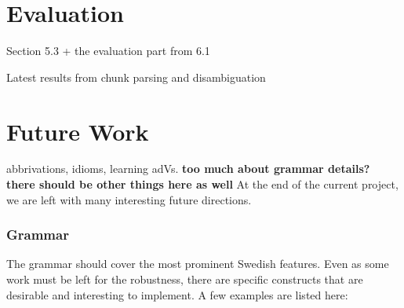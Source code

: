 \documentclass[runningheads,a4paper]{llncs}
\begin{document}
\section{Evaluation}

Section 5.3 + the evaluation part from 6.1 

Latest results from chunk parsing and disambiguation

\section{Future Work}

abbrivations, idioms, learning adVs.
\textbf{too much about grammar details? there should be other things here as well}
At the end of the current project, we are left with 
many interesting future directions.
 
\subsubsection{Grammar}
The grammar should cover the most prominent Swedish features.
Even as some work must be left for the robustness, there are specific constructs
that are desirable and interesting to implement. A few examples are listed here:\\
\end{document}

